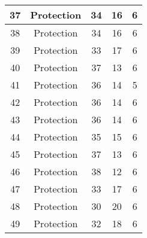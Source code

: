 \documentclass[results.tex]{subfiles}
\begin{document}
\begin{center}
\begin{tabular}{| c || c | c | c | c |}
            \hline
            37                      & Protection                   & 34                     & 16                      & 6                    \\
            \hline
            38                      & Protection                   & 34                     & 16                      & 6                    \\
            \hline
            39                      & Protection                   & 33                     & 17                      & 6                    \\
            \hline
            40                      & Protection                   & 37                     & 13                      & 6                    \\
            \hline
            41                      & Protection                   & 36                     & 14                      & 5                    \\
            \hline
            42                      & Protection                   & 36                     & 14                      & 6                    \\
            \hline
            43                      & Protection                   & 36                     & 14                      & 6                    \\
            \hline
            44                      & Protection                   & 35                     & 15                      & 6                    \\
            \hline
            45                      & Protection                   & 37                     & 13                      & 6                    \\
            \hline
            46                      & Protection                   & 38                     & 12                      & 6                    \\
            \hline
            47                      & Protection                   & 33                     & 17                      & 6                    \\
            \hline
            48                      & Protection                   & 30                     & 20                      & 6                    \\
            \hline
            49                      & Protection                   & 32                     & 18                      & 6                    \\
            \hline
        \end{tabular}
    \end{center}
\end{document}
